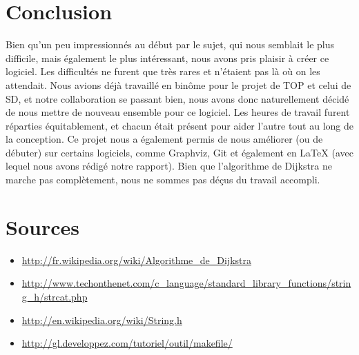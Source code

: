 \documentclass[12pt,a4paper]{report}
\begin{document}
\section{Conclusion}
Bien qu'un peu impressionnés au début par le sujet, qui nous semblait le plus difficile, mais également le plus intéressant, nous avons pris plaisir à créer ce logiciel. Les difficultés ne furent que très rares et n'étaient pas là où on les attendait. Nous avions déjà travaillé en binôme pour le projet de TOP et celui de SD, et notre collaboration se passant bien, nous avons donc naturellement décidé de nous mettre de nouveau ensemble pour ce logiciel. Les heures de travail furent réparties équitablement, et chacun était présent pour aider l'autre tout au long de la conception. Ce projet nous a également permis de nous améliorer (ou de débuter) sur certains logiciels, comme Graphviz, Git et également en LaTeX (avec lequel nous avons rédigé notre rapport). Bien que l'algorithme de Dijkstra ne marche pas complètement, nous ne sommes pas déçus du travail accompli.

\pagebreak

\section{Sources}
\begin{itemize}
\item \url{http://fr.wikipedia.org/wiki/Algorithme_de_Dijkstra}
\item \url{http://www.techonthenet.com/c_language/standard_library_functions/string_h/strcat.php}
\item \url{http://en.wikipedia.org/wiki/String.h}
\item \url{http://gl.developpez.com/tutoriel/outil/makefile/}
\end{itemize}
\end{document}
